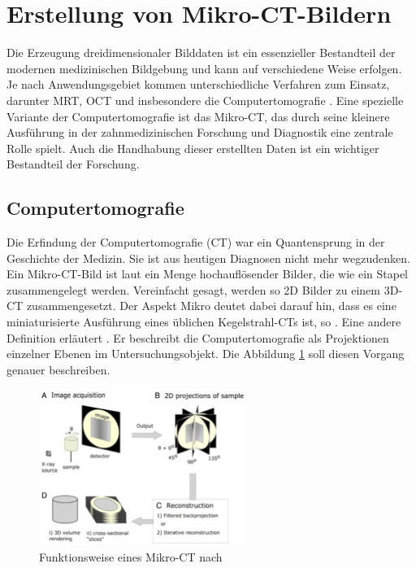 \section{Erstellung von Mikro-CT-Bildern}
\label{sec:technologisch} Die Erzeugung dreidimensionaler Bilddaten ist ein essenzieller
Bestandteil der modernen medizinischen Bildgebung und kann auf verschiedene Weise
erfolgen. Je nach Anwendungsgebiet kommen unterschiedliche Verfahren zum Einsatz,
darunter \ac{MRT}, \ac{OCT} und insbesondere die Computertomografie \citep[vgl.][S.~14]{handels2000}.
Eine spezielle Variante der Computertomografie ist das Mikro-\ac{CT}, das durch
seine kleinere Ausführung in der zahnmedizinischen Forschung und Diagnostik eine
zentrale Rolle spielt. Auch die Handhabung dieser erstellten Daten ist ein wichtiger
Bestandteil der Forschung.

\subsection{Computertomografie}
\label{subsec:computertomografie} Die Erfindung der Computertomografie (\ac{CT})
war ein Quantensprung in der Geschichte der Medizin. Sie ist aus heutigen Diagnosen
nicht mehr wegzudenken. Ein Mikro-\ac{CT}-Bild ist laut \citet[S.~1]{baird2017}
ein Menge hochauflösender Bilder, die wie ein Stapel zusammengelegt werden.
Vereinfacht gesagt, werden so \ac{2D} Bilder zu einem \ac{3D}-\ac{CT}
zusammengesetzt. Der Aspekt Mikro deutet dabei darauf hin, dass es eine
miniaturisierte Ausführung eines üblichen Kegelstrahl-\ac{CT}s ist, so \citet[S.~340]{buzug2011}.
Eine andere Definition erläutert \citet[S.~49]{lehmann2013bildverarbeitung}. Er beschreibt
die Computertomografie als Projektionen einzelner Ebenen im Untersuchungsobjekt.
Die Abbildung \ref{fig:spectrum} soll diesen Vorgang genauer beschreiben.

\begin{figure}[h]
	\centering
	\includegraphics[width=0.6\textwidth]{img/Funktion_CT.png}
	\caption{Funktionsweise eines Mikro-CT nach \citet[S.~16]{pult2021}}
	\label{fig:spectrum}
\end{figure}

